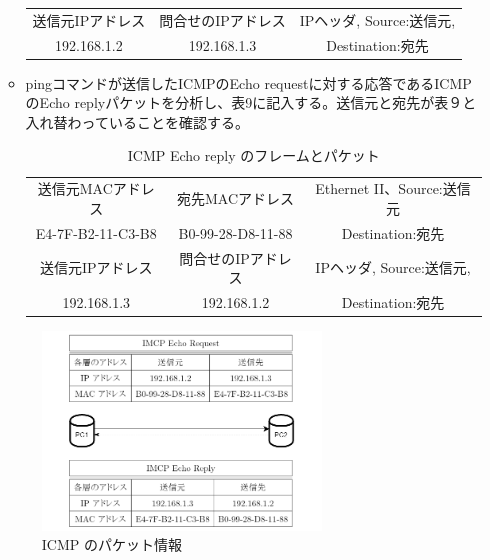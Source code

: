 \documentclass[10pt]{article}
\begin{document}
\begin{enumerate}
\begin{itemize}
\begin{table}[H]
\begin{tabular}{|c|c|c|}
                    	    送信元IPアドレス &  問合せのIPアドレス  & IPヘッダ, Source:送信元,\\
                    	     192.168.1.2 & 192.168.1.3  & Destination:宛先\\ [0.5ex] 
                    	\hline
                    \end{tabular}
                    \end{table} 
                    \endgroup
            \item pingコマンドが送信したICMPのEcho requestに対する応答であるICMPのEcho replyパケットを分析し、表9に記入する。送信元と宛先が表９と入れ替わっていることを確認する。
                    \begingroup
                    \setlength{\tabcolsep}{5pt} %
                    \renewcommand{\arraystretch}{1.5} %
                    \begin{table}[H]
                    \centering
                	\caption{ICMP Echo reply のフレームとパケット}
                	\begin{tabular}{|c|c|c|} 
                    	\hline
                    	    送信元MACアドレス &  宛先MACアドレス  & Ethernet II、Source:送信元\\
                    	    E4-7F-B2-11-C3-B8  & B0-99-28-D8-11-88 & Destination:宛先\\ [0.5ex] 
                    	\hline
                    	    送信元IPアドレス &  問合せのIPアドレス  & IPヘッダ, Source:送信元,\\
                    	     192.168.1.3 & 192.168.1.2  & Destination:宛先\\ [0.5ex] 
                    	\hline
                    \end{tabular}
                    \end{table} 
                    \endgroup
        \end{itemize} 
        
    \begin{figure}[H]
		\centering
		\includegraphics[width=0.7\textwidth]{zu18.png}
		\caption{ICMP のパケット情報}
	\end{figure}
        

\end{enumerate}
\end{document}
